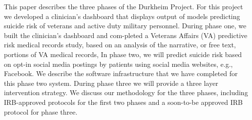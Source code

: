 This paper describes the three phases of the Durkheim Project.              For this project we developed a clinician's dashboard that displays output of models predicting suicide risk of veterans and active duty military personnel. During phase one, we built the clinician's dashboard and com-pleted a Veterans Affairs (VA) predictive risk medical records study, based on an analysis of the narrative, or free text, portions of VA medical records, In phase two, we will predict suicide risk based on opt-in social media postings by patients using social media websites, e.g., Facebook. We describe the software infrastructure that we have completed for this phase two system. During phase three we will provide a three layer intervention strategy.  We discuss our methodology for the three phases, including IRB-approved protocols for the first two phases and a soon-to-be approved IRB protocol for phase three.
